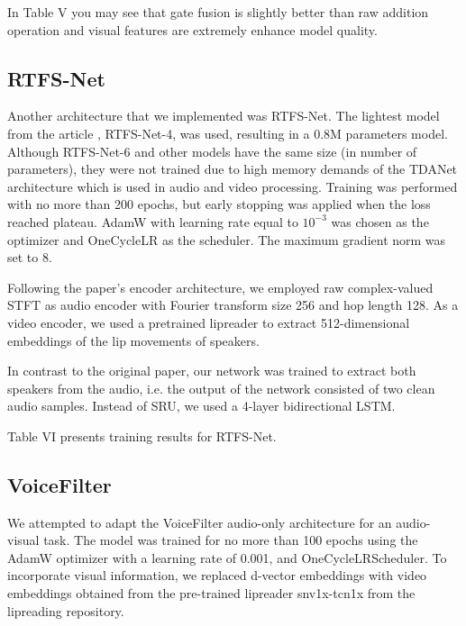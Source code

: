 \documentclass[10pt,conference,compsocconf]{IEEEtran}
\begin{document}
In Table V you may see that gate fusion is slightly better than raw addition operation and visual features are extremely enhance model quality.

\subsection{\textbf{RTFS-Net}}
Another architecture that we implemented was RTFS-Net. The lightest model from the article \cite{pegg2024rtfsnet}, RTFS-Net-4, was used, resulting in a 0.8M parameters model. Although RTFS-Net-6 and other models have the same size (in number of parameters), they were not trained due to high memory demands of the TDANet \cite{tdanet} architecture which is used in audio and video processing. Training was performed with no more than 200 epochs, but early stopping was applied when the loss reached plateau. AdamW with learning rate equal to $10^{-3}$ was chosen as the optimizer and OneCycleLR as the scheduler. The maximum gradient norm was set to 8.

Following the paper's encoder architecture, we employed raw complex-valued STFT as audio encoder with Fourier transform size 256 and hop length 128. As a video encoder, we used a pretrained lipreader to extract 512-dimensional embeddings of the lip movements of speakers.

In contrast to the original paper, our network was trained to extract both speakers from the audio, i.e. the output of the network consisted of two clean audio samples. Instead of SRU, we used a 4-layer bidirectional LSTM.

Table VI presents training results for RTFS-Net.
\begin{table}[h!]
\centering
\caption{RTFS-Net training results.}
\end{table}

\subsection{\textbf{VoiceFilter}}
We attempted to adapt the VoiceFilter \cite{wang2019voicefilter} audio-only architecture for an audio-visual task. The model was trained for no more than 100 epochs using the AdamW optimizer with a learning rate of 0.001, and OneCycleLRScheduler. To incorporate visual information, we replaced d-vector embeddings with video embeddings obtained from the pre-trained lipreader snv1x-tcn1x from the lipreading repository.
\end{document}
